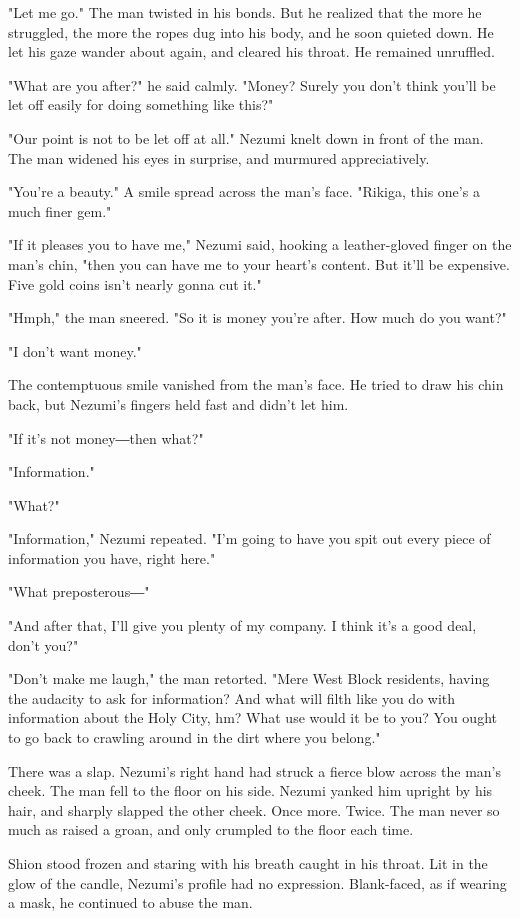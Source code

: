 "Let me go." The man twisted in his bonds. But he realized that the more
he struggled, the more the ropes dug into his body, and he soon quieted
down. He let his gaze wander about again, and cleared his throat. He
remained unruffled.

"What are you after?" he said calmly. "Money? Surely you don't think
you'll be let off easily for doing something like this?"

"Our point is not to be let off at all." Nezumi knelt down in front of
the man. The man widened his eyes in surprise, and murmured
appreciatively.

"You're a beauty." A smile spread across the man's face. "Rikiga, this
one's a much finer gem."

"If it pleases you to have me," Nezumi said, hooking a leather-gloved
finger on the man's chin, "then you can have me to your heart's content.
But it'll be expensive. Five gold coins isn't nearly gonna cut it."

"Hmph," the man sneered. "So it is money you're after. How much do you
want?"

"I don't want money."

The contemptuous smile vanished from the man's face. He tried to draw
his chin back, but Nezumi's fingers held fast and didn't let him.

"If it's not money―then what?"

"Information."

"What?"

"Information," Nezumi repeated. "I'm going to have you spit out every
piece of information you have, right here."

"What preposterous―"

"And after that, I'll give you plenty of my company. I think it's a good
deal, don't you?"

"Don't make me laugh," the man retorted. "Mere West Block residents,
having the audacity to ask for information? And what will filth like you
do with information about the Holy City, hm? What use would it be to
you? You ought to go back to crawling around in the dirt where you
belong."

There was a slap. Nezumi's right hand had struck a fierce blow across
the man's cheek. The man fell to the floor on his side. Nezumi yanked
him upright by his hair, and sharply slapped the other cheek. Once more.
Twice. The man never so much as raised a groan, and only crumpled to the
floor each time.

Shion stood frozen and staring with his breath caught in his throat. Lit
in the glow of the candle, Nezumi's profile had no expression.
Blank-faced, as if wearing a mask, he continued to abuse the man.

